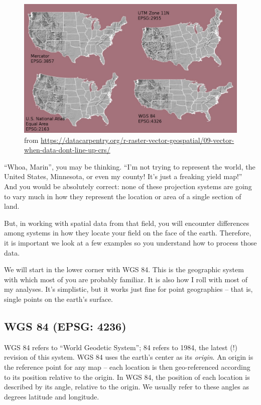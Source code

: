 \documentclass[
]{book}
\begin{document}
\begin{figure}
\centering
\includegraphics{data-unit-12/images/map_usa_different_projections.jpg}
\caption{from \url{https://datacarpentry.org/r-raster-vector-geospatial/09-vector-when-data-dont-line-up-crs/}}
\end{figure}

``Whoa, Marin'', you may be thinking. ``I'm not trying to represent the world, the United States, Minnesota, or even my county! It's just a freaking yield map!'' And you would be absolutely correct: none of these projection systems are going to vary much in how they represent the location or area of a single section of land.

But, in working with spatial data from that field, you will encounter differences among systems in how they locate your field on the face of the earth. Therefore, it is important we look at a few examples so you understand how to process those data.

We will start in the lower corner with WGS 84. This is the geographic system with which most of you are probably familiar. It is also how I roll with most of my analyses. It's simplistic, but it works just fine for point geographies -- that is, single points on the earth's surface.

\hypertarget{wgs-84-epsg-4236}{%
\subsection{WGS 84 (EPSG: 4236)}\label{wgs-84-epsg-4236}}

WGS 84 refers to ``World Geodetic System''; 84 refers to 1984, the latest (!) revision of this system. WGS 84 uses the earth's center as its \emph{origin}. An origin is the reference point for any map -- each location is then geo-referenced according to its position relative to the origin. In WGS 84, the position of each location is described by its angle, relative to the origin. We usually refer to these angles as degrees latitude and longitude.
\end{document}
